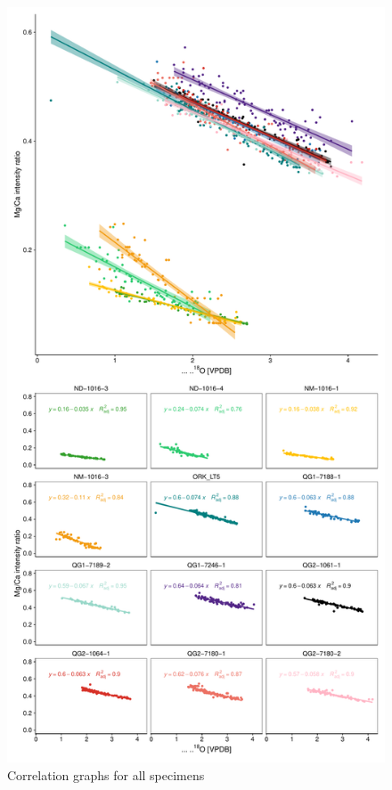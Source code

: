 \documentclass[
  authoryear,
  preprint,
  3p]{elsarticle}
\begin{document}
\section{}\label{section}

\begin{figure}[H]

{\centering \includegraphics{Manuscript_files/figure-pdf/Correlation Graphs-1.pdf}

}

\caption{Correlation graphs for all specimens}

\end{figure}%
\end{document}
